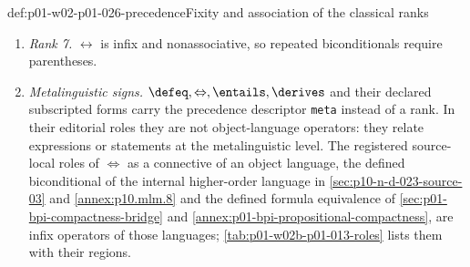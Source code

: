 \begin{hbconvention}{def:p01-w02-p01-026-precedence}{Fixity and association of the classical ranks}
\begin{enumerate}
\item \emph{Rank 7.}  \(\leftrightarrow\) is infix and nonassociative, so
  repeated biconditionals require parentheses.
\item \emph{Metalinguistic signs.}  \(\defeq,\Leftrightarrow,\entails,\derives\)
  and their declared subscripted forms carry the precedence descriptor
  \texttt{meta} instead of a rank.  In their editorial roles they are not
  object-language operators: they relate expressions or statements at the
  metalinguistic level.  The registered source-local roles of
  \(\Leftrightarrow\) as a connective of an object language, the defined
  biconditional of the internal higher-order language in
  \cref{sec:p10-n-d-023-source-03} and \cref{annex:p10.mlm.8} and the
  defined formula equivalence of \cref{sec:p01-bpi-compactness-bridge} and
  \cref{annex:p01-bpi-propositional-compactness}, are infix operators of
  those languages; \cref{tab:p01-w02b-p01-013-roles} lists them with their
  regions.
\end{enumerate}
\end{hbconvention}

